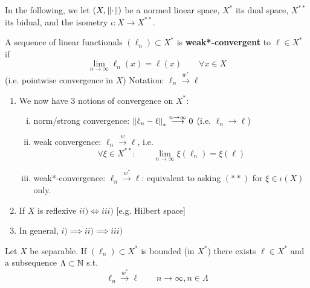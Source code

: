 \documentclass{article}
\begin{document}
In the following, we let $(X, \left\|{\cdot}\right\|)$ be a normed linear space, $X^*$ its dual space, $X^{**}$ its bidual, and the isometry $\iota: X \to X^{**}$.  

\begin{definition}
    A sequence of linear functionals $(\ell_n) \subset X^*$ is \textbf{weak*-convergent} to $\ell \in X^*$ if  
    $$
    \lim_{n\to \infty} \ell_n(x) = \ell(x) \qquad \forall x\in X
    $$
    (i.e. pointwise convergence in $X$) Notation: $\ell_n \overset{w^*}{\longrightarrow} \ell$
\end{definition}  

\begin{remark}
\begin{enumerate}[1)]
    \item We now have 3 notions of convergence on $X^*$:
    \begin{enumerate}[i)]
        \item norm/strong convergence: $\left\|{\ell_n-\ell}\right\|_* \overset{n\to \infty}{\longrightarrow} 0$ (i.e. $\ell_n \to \ell$)
        \item weak convergence: $\ell_n \overset{w}{\longrightarrow} \ell$, i.e.  
        \begin{equation*}
        \forall \xi \in X^{**}: \qquad \lim_{n\to \infty} \xi(\ell_n) = \xi(\ell)    \tag{**}
        \end{equation*}
        \item weak*-convergence: $\ell_n \overset{w^*}{\longrightarrow} \ell$: equivalent to asking $(**)$ for $\xi \in \iota(X)$ only. 
    \end{enumerate}
    \item If $X$ is reflexive $ii) \iff iii)$ [e.g. Hilbert space]
    \item In general, $i) \implies ii) \implies iii)$
\end{enumerate}
    
\end{remark}

\begin{theorem}\nl
\label{Banach-Alaoglu}
Let $X$ be separable. If $(\ell_n) \subset X^*$ is bounded (in $X^*$) there exists $\ell\in X^*$ and a subsequence $\Lambda \subset \mathbb{N}$ s.t.  
$$
\ell_n \overset{w^*}{\longrightarrow} \ell \qquad n \to \infty, n\in \Lambda
$$
\end{theorem}
\end{document}
